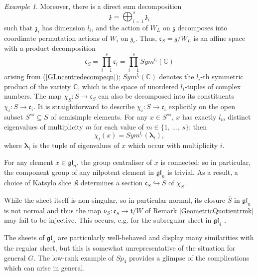 \documentclass{amsart}
\theoremstyle{remark}
\newtheorem{example}[theorem]{Example}
\numberwithin{theorem}{section}
\numberwithin{equation}{section}
\begin{document}
\begin{example}
    Moreover, there is a direct sum decomposition
    \begin{equation}\label{GLncentredecompeqn}
        \mathfrak{z} = \bigoplus_{i=1}^s\mathfrak{z}_i
    \end{equation}
    such that $\mathfrak{z}_i$ has dimension $l_i$, and the action of $W_L$ on $\mathfrak{z}$ decomposes into coordinate permutation actions of $W_i$ on $\mathfrak{z}_i$. Thus, $\mathfrak{c}_S = \mathfrak{z}/W_L$ is an affine space with a product decomposition
    \begin{equation}\label{GLnQuotientdecompeqn}
        \mathfrak{c}_S = \prod_{i=1}^s\mathfrak{c}_i = \prod_{i=1}^sSym^{l_i}(\mathbb{C})
    \end{equation}
    arising from (\ref{GLncentredecompeqn}); $Sym^{l_i}(\mathbb{C})$ denotes the $l_i$-th symmetric product of the variety $\mathbb{C}$, which is the space of unordered $l_i$-tuples of complex numbers. The map $\chi_S:S \rightarrow \mathfrak{c}_S$ can also be decomposed into its constituents $\chi_i:S \rightarrow \mathfrak{c}_i$. It is straightforward to describe $\chi_i:S \rightarrow \mathfrak{c}_i$ explicitly on the open subset $S^{ss} \subseteq S$ of semisimple elements. For any $x \in S^{ss}$, $x$ has exactly $l_m$ distinct eigenvalues of multiplicity $m$ for each value of $m \in \{1, \,  ...,\, s\}$; then
    \begin{equation}\label{ChevalleyMapGLneqn}
        \chi_i(x) = Sym^{l_i}(\boldsymbol{ \lambda}_i),
    \end{equation}
    where $\boldsymbol{ \lambda}_i$ is the tuple of eigenvalues of $x$ which occur with multiplicity $i$.

    For any element $x \in \mathfrak{gl}_n$, the group centraliser of $x$ is connected; so in particular, the component group of any nilpotent element in $\mathfrak{gl}_n$ is trivial. As a result, a choice of Katsylo slice $\mathfrak{K}$ determines a section $\mathfrak{c}_S \hookrightarrow S$ of $\chi_S$.

    While the sheet itself is non-singular, so in particular normal, its closure $\overline{S}$ in $\mathfrak{gl}_n$ is not normal and thus the map $\nu_S:\mathfrak{c}_S \rightarrow \mathfrak{t}/W$ of Remark \ref{GeometricQuotientrmk} may fail to be injective. This occurs, e.g. for the subregular sheet in $\mathfrak{gl}_4$ \cite[6.1]{Borho2}.
\end{example}
The sheets of $\mathfrak{gl}_n$ are particularly well-behaved and display many similarities with the regular sheet, but this is somewhat unrepresentative of the situation for general $G$. The low-rank example of $Sp_4$ provides a glimpse of the complications which can arise in general.
\end{document}
